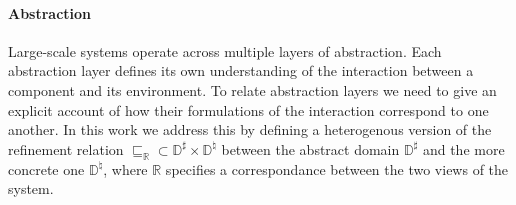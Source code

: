 \documentclass[sigplan,10pt,review,anonymous]{acmart}\settopmatter{printfolios=true,printccs=false,printacmref=false}
\begin{document}

\paragraph{Abstraction} %

Large-scale systems operate across multiple layers of abstraction.
Each abstraction layer defines its own understanding of the interaction
between a component and its environment.
To relate abstraction layers we need to give
an explicit account of how their formulations of the interaction
correspond to one another.
In this work we address this by defining a heterogenous version
of the refinement relation
${\sqsubseteq_\mathbb{R}} \subset
 \mathbb{D}^\sharp \times \mathbb{D}^\natural$ between
the abstract domain $\mathbb{D}^\sharp$ and
the more concrete one $\mathbb{D}^\natural$, where
$\mathbb{R}$ specifies a correspondance between
the two views of the system.



%
%
%
\end{document}
